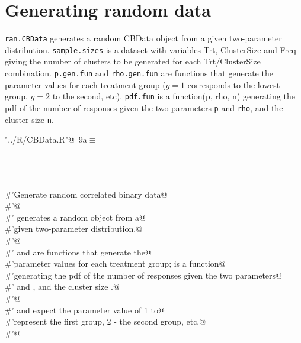 \documentclass[reqno]{amsart}
\renewcommand{\NWtarget}[2]{\hypertarget{#1}{#2}}
\begin{document}
\section{Generating random data}
\texttt{ran.CBData} generates a random CBData object from a given two-parameter
distribution. \texttt{sample.sizes} is a dataset with variables Trt, ClusterSize and
Freq giving the number of clusters to be generated for each Trt/ClusterSize combination.
\texttt{p.gen.fun} and \texttt{rho.gen.fun} are functions that generate the parameter
values for each treatment group ($g=1$ corresponds to the lowest group, $g=2$ to the
second, etc). \texttt{pdf.fun} is a function(p, rho, n) generating the pdf of the
number of responses given the two parameters \texttt{p} and \texttt{rho}, and the
cluster size \texttt{n}.

\begin{flushleft} \small\label{scrap14}\raggedright\small
\NWtarget{nuweb9a}{} \verb@"../R/CBData.R"@\nobreak\ {\footnotesize {9a}}$\equiv$
\vspace{-1ex}
\begin{list}{}{} \item
\mbox{}\verb@@\\
\mbox{}\verb@@\\
\mbox{}\verb@@\\
\mbox{}\verb@#'Generate random correlated binary data@\\
\mbox{}\verb@#'@\\
\mbox{}\verb@#' generates a random  object from a@\\
\mbox{}\verb@#'given two-parameter distribution.@\\
\mbox{}\verb@#'@\\
\mbox{}\verb@#' and  are functions that generate the@\\
\mbox{}\verb@#'parameter values for each treatment group;  is a function@\\
\mbox{}\verb@#'generating the pdf of the number of responses given the two parameters@\\
\mbox{}\verb@#' and , and the cluster size .@\\
\mbox{}\verb@#'@\\
\mbox{}\verb@#' and  expect the parameter value of 1 to@\\
\mbox{}\verb@#'represent the first group, 2 - the second group, etc.@\\
\mbox{}\verb@#'@\\

\end{list}
\end{flushleft}
\end{document}
